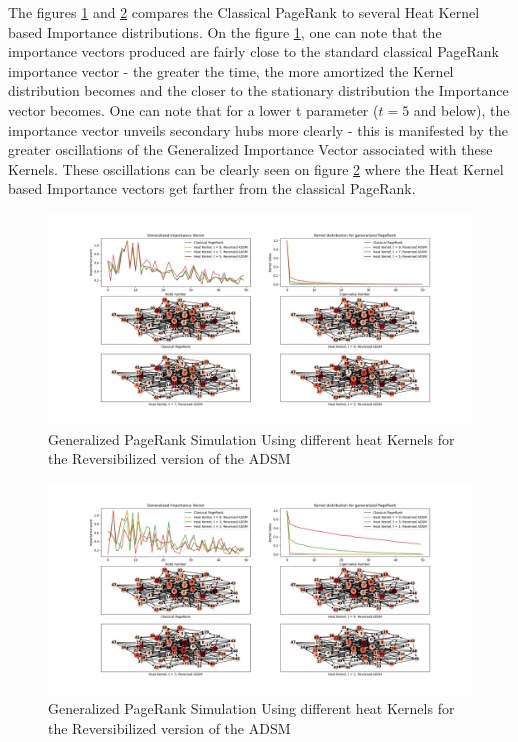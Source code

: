 \documentclass[sn-mathphys]{sn-jnl}%
\theoremstyle{thmstyleone}%
\theoremstyle{thmstyletwo}%
\theoremstyle{thmstylethree}%
\begin{document}
The figures \ref{fig:heatKComparison} and \ref{fig:heatKComparison2}
compares the Classical PageRank to several Heat Kernel based
Importance distributions. On the figure \ref{fig:heatKComparison}, one
can note that the importance vectors produced are fairly close to the
standard classical PageRank importance vector - the greater the time,
the more amortized the Kernel distribution becomes and the closer to
the stationary distribution the Importance vector becomes. One can
note that for a lower t parameter ($t=5$ and below), the importance
vector unveils secondary hubs more clearly - this is manifested by the
greater oscillations of the Generalized Importance Vector associated
with these Kernels. These oscillations can be clearly seen on figure
\ref{fig:heatKComparison2} where the Heat Kernel based Importance
vectors get farther from the classical PageRank.

\begin{figure}[h!]
    \centering
    \centerline{
    \includegraphics[width= 1.55\textwidth]{results_figures/heat_kernel_comparison.png}
    }
    \caption{Generalized PageRank Simulation Using different heat Kernels for the Reversibilized version of the ADSM}
    \label{fig:heatKComparison}
\end{figure}

\begin{figure}[h!]
    \centering
    \centerline{
    \includegraphics[width= 1.55\textwidth]{results_figures/heat_kernel_comparison_2.png}}
    \caption{Generalized PageRank Simulation Using different heat Kernels for the Reversibilized version of the ADSM}
    \label{fig:heatKComparison2}
\end{figure}
\end{document}
